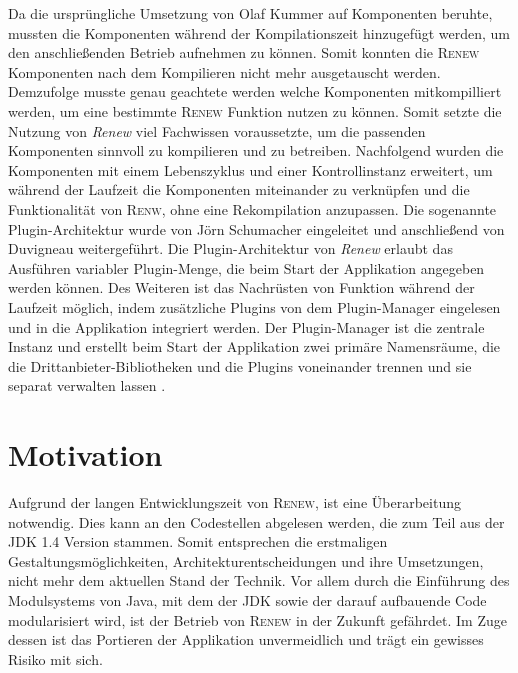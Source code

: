 	Da die ursprüngliche Umsetzung von Olaf Kummer auf Komponenten beruhte, mussten die Komponenten während der Kompilationszeit hinzugefügt werden, um den anschließenden Betrieb aufnehmen zu können. Somit konnten die \textsc{Renew} Komponenten nach dem Kompilieren nicht mehr ausgetauscht werden.\newline
	Demzufolge musste genau geachtete werden welche Komponenten mitkompilliert werden, um eine bestimmte \textsc{Renew} Funktion nutzen zu können. Somit setzte die Nutzung von \textit{Renew} viel Fachwissen voraussetzte, um die passenden Komponenten sinnvoll zu kompilieren und zu betreiben. \newline 
	Nachfolgend wurden die Komponenten mit einem Lebenszyklus und einer Kontrollinstanz erweitert, um während der Laufzeit die Komponenten miteinander zu verknüpfen und die Funktionalität von \textsc{Renw}, ohne eine Rekompilation anzupassen. Die sogenannte Plugin-Architektur wurde von Jörn Schumacher \cite{Schumacher03} eingeleitet und anschließend von Duvigneau \cite{Duvigneau09} weitergeführt.\newline
	Die Plugin-Architektur von \textit{Renew} erlaubt das Ausführen variabler Plugin-Menge, die beim Start der Applikation angegeben werden können. Des Weiteren ist das Nachrüsten von Funktion während der Laufzeit möglich, indem zusätzliche Plugins von dem Plugin-Manager eingelesen und in die Applikation integriert werden. Der Plugin-Manager ist die zentrale Instanz und erstellt beim Start der Applikation zwei primäre Namensräume, die die Drittanbieter-Bibliotheken und die Plugins voneinander trennen und sie separat verwalten lassen \cite{Duvigneau09}.

\section{Motivation} \label{sec:motivation1}
	Aufgrund der langen Entwicklungszeit von \textsc{Renew}, ist eine Überarbeitung notwendig. Dies kann an den Codestellen abgelesen werden, die zum Teil aus der JDK 1.4 Version stammen. Somit entsprechen die erstmaligen Gestaltungsmöglichkeiten, Architekturentscheidungen und ihre Umsetzungen, nicht mehr dem aktuellen Stand der Technik. Vor allem durch die Einführung des Modulsystems von Java, mit dem der JDK sowie der darauf aufbauende Code modularisiert wird, ist der Betrieb von \textsc{Renew} in der Zukunft gefährdet. Im Zuge dessen ist das Portieren der Applikation unvermeidlich und trägt ein gewisses Risiko mit sich.

